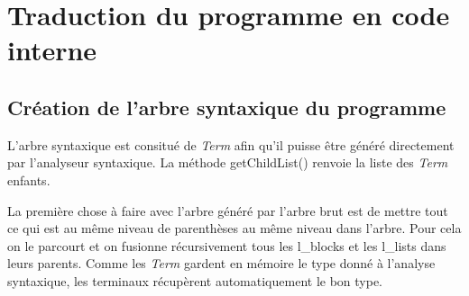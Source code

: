 \section{Traduction du programme en code interne}
	\subsection{Création de l'arbre syntaxique du programme}
		L'arbre syntaxique est consitué de \emph{Term} afin
		qu'il puisse être généré directement par l'analyseur syntaxique. 
		La méthode getChildList() renvoie la liste des \emph{Term} enfants.

		La première chose à faire avec l'arbre généré par l'arbre brut est
		de mettre tout ce qui est au même niveau de parenthèses au même niveau
		dans l'arbre. Pour cela on le parcourt et on fusionne récursivement tous
		les l_blocks et les l_lists dans leurs parents. Comme les \emph{Term}
		gardent en mémoire le type donné à l'analyse syntaxique, les terminaux
		récupèrent automatiquement le bon type. 

			
